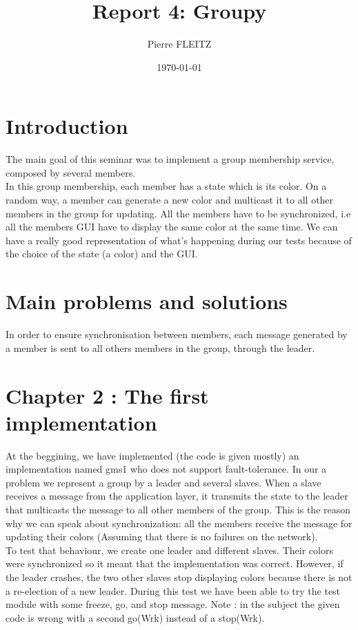\documentclass[a4paper, 11pt]{article}
\title{Report 4: Groupy}
\author{Pierre FLEITZ}
\date{\today{}}
\begin{document}
\maketitle

\section{Introduction}

The main goal of this seminar was to implement a group membership service, composed by several members.\\
In this group membership, each member has a state which is its color. On a random way, a member can generate a new color and multicast it to all other members in the group for updating. All the members have to be synchronized, i.e all the members GUI have to display the same color at the same time. We can have a really good representation of what's happening during our tests because of the choice of the state (a color) and the GUI.

\section{Main problems and solutions}

In order to ensure synchronisation between members, each message generated by a member is sent to all others members in the group, through the leader.

\section{Chapter 2 : The first implementation}

At the beggining, we have implemented (the code is given mostly) an implementation named gms1 who does not support fault-tolerance. In our a problem we represent a group by a leader and several slaves. When a slave receives a message from the application layer, it transmits the state to the leader that multicasts the message to all other members of the group. This is the reason why we can speak about synchronization: all the members receive the message for updating their colors (Assuming that there is no failures on the network).\\

To test that behaviour, we create one leader and different slaves. Their colors were synchronized so it meant that the implementation was correct. However, if the leader crashes, the two other slaves stop displaying colors because there is not a re-election of a new leader. During this test we have been able to try the test module with some freeze, go, and stop message. Note : in the subject the given code is wrong with a second go(Wrk) instead of a stop(Wrk).
\end{document}
